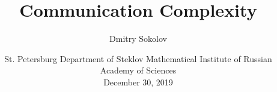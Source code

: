 

\titlegraphic{
    
}


\title[Communication Complexity]{
    Communication Complexity
}

\author[Sokolov D.]{
    Dmitry Sokolov
}  


\date{
    St. Petersburg Department of Steklov Mathematical Institute of Russian Academy of Sciences\\
    December 30, 2019
}





    \maketitle

    
    
    
    
    
    

